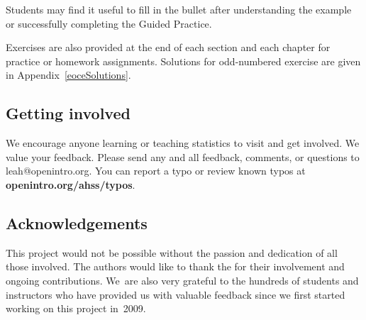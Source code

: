 Students may find it useful to fill in the bullet after understanding the example or successfully completing the Guided Practice.

\noindent%
Exercises are also provided at the end of each section and each chapter for practice or homework assignments.  
Solutions for odd-numbered exercise are given in
Appendix~\ref{eoceSolutions}.

\subsection*{Getting involved}
We encourage anyone learning or teaching statistics to visit  and get involved. We value your feedback.  Please send any and all feedback, comments, or questions to leah@openintro.org.  You can report a typo or review known typos at 
    {\color{black}\textbf{openintro.org/ahss/typos}}.


\subsection*{Acknowledgements}

This project would not be possible without the passion
and dedication of all those involved.
The authors would like to thank the
for their involvement and ongoing contributions.
We~are also very grateful to the hundreds of students
and instructors who have provided us with valuable feedback
since we first started working on this project in~2009.  




